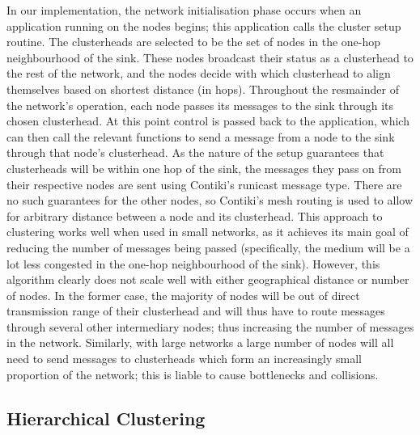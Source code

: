 In our implementation, the network initialisation phase occurs when an application running on the nodes begins; this application calls the cluster setup routine. The clusterheads are selected to be the set of nodes in the one-hop neighbourhood of the sink. These nodes broadcast their status as a clusterhead to the rest of the network, and the nodes decide with which clusterhead to align themselves based on shortest distance (in hops). Throughout the resmainder of the network's operation, each node passes its messages to the sink through its chosen clusterhead. At this point control is passed back to the application, which can then call the relevant functions to send a message from a node to the sink through that node's clusterhead. As the nature of the setup guarantees that clusterheads will be within one hop of the sink, the messages they pass on from their respective nodes are sent using Contiki's runicast message type. There are no such guarantees for the other nodes, so Contiki's mesh routing is used to allow for arbitrary distance between a node and its clusterhead. This approach to clustering works well when used in small networks, as it achieves its main goal of reducing the number of messages being passed (specifically, the medium will be a lot less congested in the one-hop neighbourhood of the sink). However, this algorithm clearly does not scale well with either geographical distance or number of nodes. In the former case, the majority of nodes will be out of direct transmission range of their clusterhead and will thus have to route messages through several other intermediary nodes; thus increasing the number of messages in the network. Similarly, with large networks a large number of nodes will all need to send messages to clusterheads which form an increasingly small proportion of the network; this is liable to cause bottlenecks and collisions.

\subsection{Hierarchical Clustering}


